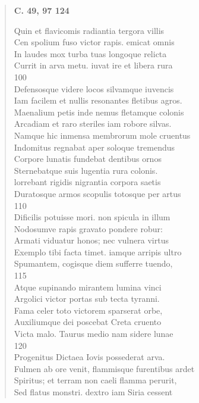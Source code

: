 \documentclass[11pt, a4paper]{report}
\begin{document}
\begin{verse}
    \begin{center} \textbf{C. 49, 97 124} \end{center} \marginpar{[56]} Quin et flavicomis radiantia tergora villis \\ Cen spolium fuso victor rapis. emicat omnis \\ In laudes mox turba tuas longoque relicta \\ Currit in arva metu. iuvat ire et libera rura \\ 100 \\ Defensosque videre locos silvamque iuvencis \\ Iam facilem et nullis resonantes fletibus agros. \\ Maenalium petis inde nemus fletamque colonis \\ Arcadiam et raro steriles iam robore silvas. \\ Namque hic inmensa membrorum mole cruentus \\ Indomitus regnabat aper soloque tremendus \\ Corpore lunatis fundebat dentibus ornos \\ Sternebatque suis lugentia rura colonis. \\ lorrebant rigidis nigrantia corpora saetis \\ Duratosque armos scopulis totosque per artus \\ 110 \\ Dificilis potuisse mori. non spicula in illum \\ Nodosumve rapis gravato pondere robur: \\ Armati viduatur honos; nec vulnera virtus \\ Exemplo tibi facta timet. iamque arripis ultro \\ Spumantem, cogisque diem sufferre tuendo, \\ 115 \\ Atque supinando mirantem lumina vinci \\ Argolici victor portas sub tecta tyranni. \\ Fama celer toto victorem sparserat orbe, \\ Auxiliumque dei poscebat Creta cruento \\ Victa malo. Taurus medio nam sidere lunae \\ 120 \\ Progenitus Dictaea Iovis possederat arva. \\ Fulmen ab ore venit, flammisque furentibus ardet \\ Spiritus; et terram non caeli flamma perurit, \\ Sed flatus monstri. dextro iam Siria cessent \\ 

\end{verse}
\end{document}
